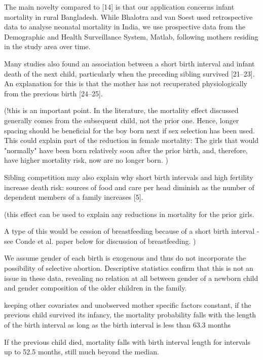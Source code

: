 \citet{Soest2018}

The main novelty compared to [14] is that our application concerns
infant mortality in rural Bangladesh. While Bhalotra and van Soest used
retrospective data to analyse neonatal mortality in India, we use
prospective data from the Demographic and Health Surveillance System,
Matlab, following mothers residing in the study area over time.


Many studies also found an association between a short birth interval
and infant death of the next child, particularly when the preceding
sibling survived [21–23]. An explanation for this is that the mother has
not recuperated physiologically from the previous birth [24–25].

(!this is an important point. In the literature, the mortality effect discussed
generally comes from the subsequent child, not the prior one. 
Hence, longer spacing should be beneficial for the boy born next if 
sex selection has been used.
This could explain part of the reduction in female mortality: The
girls that would "normally" have been born relatively soon after the
prior birth, and, therefore, have higher mortality risk, now are no
longer born.
)

Sibling competition may also explain why short birth intervals and high
fertility increase death risk: sources of food and care per head
diminish as the number of dependent members of a family increases [5].

(this effect can be used to explain any reductions in mortality for
the prior girls.

A type of this would be cession of breastfeeding because of a short
birth interval - see Conde et al. paper below for discussion of 
breastfeeding. 
)

We assume gender of each birth is exogenous and thus do not incorporate
the possibility of selective abortion. Descriptive statistics confirm
that this is not an issue in these data, revealing no relation at all
between gender of a newborn child and gender composition of the older
children in the family.


keeping other covariates and unobserved mother specific factors
constant, if the previous child survived its infancy, the mortality
probability falls with the length of the birth interval as long as the
birth interval is less than 63.3 months

If the previous child died, mortality falls with birth interval length
for intervals up to 52.5 months, still much beyond the median.

